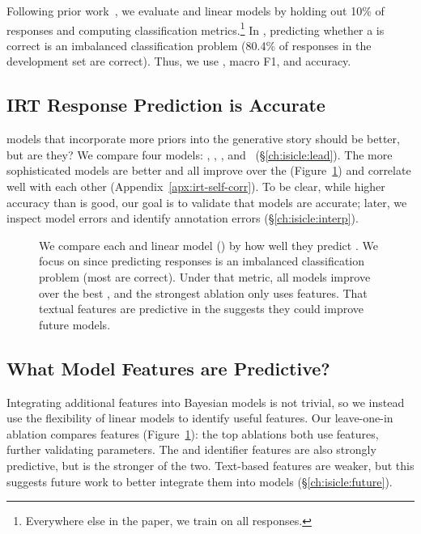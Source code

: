Following prior work~\citep{wu2020virt}, we evaluate \irt{} and linear models by holding out 10\% of responses and computing classification metrics.\footnote{Everywhere else in the paper, we train on all responses.}
In \squad{}, predicting whether a \resp{} is correct is an imbalanced
classification problem (80.4\% of responses in the development set are
correct).
Thus, we use , macro F1, and accuracy.

\subsection{IRT Response Prediction is Accurate}
\label{ch:isicle:irt-compare}

\irt{} models that incorporate more priors into the generative story should be better, but are they?
We compare four \irt{} models: , , , and ~(\S\ref{ch:isicle:lead}).
The more sophisticated models are better and all improve over the
 (Figure~\ref{fig:vw-ablation}) and correlate well with each other (Appendix~\ref{apx:irt-self-corr}).
To be clear, while higher accuracy than  is good, our goal is to validate that \irt{} models are accurate; later, we inspect model errors and identify annotation errors (\S\ref{ch:isicle:interp}).

\begin{figure}[th]
    \centering
    \caption{
        We compare each \irt{} and linear model () by how well they predict \subj{} \resps{}.
        We focus on  since predicting responses is an imbalanced classification problem (most \subjs{} are correct).
        Under that metric, all \irt{} models improve over the best
        , and the strongest  ablation only uses \irt{} features.
        That textual features are predictive in the  suggests they could improve future models.
    }
    \label{fig:vw-ablation}
\end{figure}


\subsection{What Model Features are Predictive?}

Integrating additional features into Bayesian models is not trivial,
so we instead use the flexibility of linear models to identify useful
features.
Our leave-one-in ablation compares features (Figure~\ref{fig:vw-ablation}):
the top ablations both use \irt{} features, further validating
\irt{} parameters.
The \subj{} and \itm{} identifier features are also
strongly predictive, but \itm{} is the stronger of the two.
Text-based features are weaker, but this suggests future work to
better integrate them into \irt{} models (\S\ref{ch:isicle:future}).



